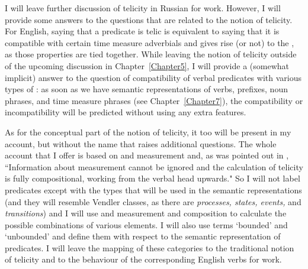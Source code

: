 
 
I will leave further discussion of telicity in Russian for  work. However, I will provide some answers to the questions that are related to the notion of telicity. For English, saying that a predicate is telic is equivalent to saying that it is compatible with certain time measure adverbials and gives rise (or not) to the , as those properties are tied together. While leaving the notion of telicity outside of the upcoming discussion in Chapter~\ref{Chapter5}, I will provide a (somewhat implicit) answer to the question of compatibility of verbal predicates with various types of : as soon as we have semantic representations of verbs, prefixes, noun phrases, and time measure phrases (see Chapter~\ref{Chapter7}), the compatibility or incompatibility will be predicted without using any extra features.

As for the conceptual part of the notion of telicity, it too will be present in my account, but without the name that raises additional questions. The whole account that I offer is based on  and measurement and, as was pointed out in \citet[60]{Rothstein:08}, ``Information about measurement cannot be ignored and the calculation of telicity is fully compositional, working from the verbal head upwards." So I will not label predicates except with the types that will be used in the semantic representations (and they will resemble Vendler classes, as there are \textit{processes, states, events,} and \textit{transitions}) and I will use  and measurement and composition to calculate the possible combinations of various elements. I will also use terms `bounded' and `unbounded' and define them with respect to the semantic representation of predicates. I will leave the mapping of these categories to the traditional notion of telicity and to the behaviour of the corresponding English verbs for  work.
 
